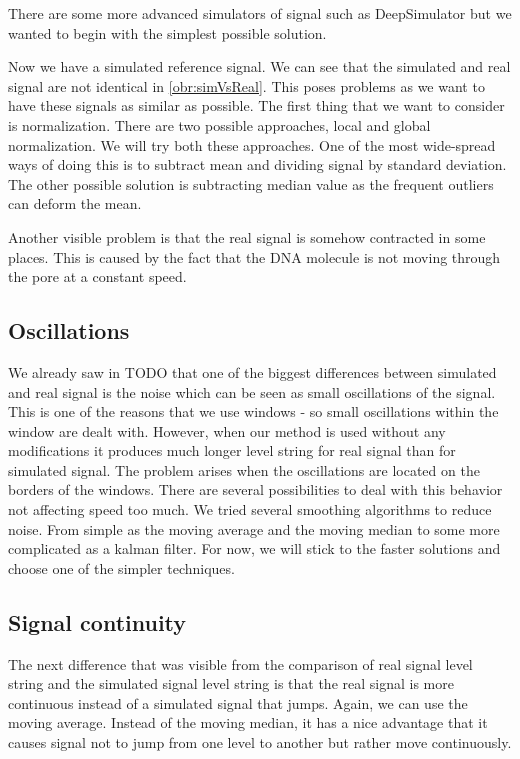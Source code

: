 There are some more advanced simulators of signal such as DeepSimulator but we
wanted to begin with the simplest possible solution.

Now we have a simulated reference signal. We can see that the simulated and real
signal are not identical in \ref{obr:simVsReal}. This poses problems as we want to have these signals as
similar as possible. The first thing that we want to consider is normalization. There
are two possible approaches, local and global normalization. We will try both these
approaches. One of the most wide-spread ways of doing this is to subtract mean and dividing
signal by standard deviation. The other possible solution is subtracting median value
as the frequent outliers can deform the mean. 

Another visible problem is that the real signal is somehow contracted
in some places. This is caused by the fact that the DNA molecule is not moving
through the pore at a constant speed. 

\subsection{Oscillations}

We already saw in TODO that one of the biggest differences between simulated and
real signal is the noise which can be seen as small oscillations of the signal. This is
one of the reasons that we use windows - so small oscillations within the window
are dealt with. However, when our method is used without any modifications it
produces much longer level string for real signal than for simulated signal.
The problem arises when the oscillations are located on the borders of the windows.
There are several possibilities to deal with this behavior not affecting speed too
much. We tried several smoothing algorithms to reduce noise. From simple as the
moving average and the moving median to some more complicated as a kalman filter.
For now, we will stick to the faster solutions and choose one of the simpler techniques.

\subsection{Signal continuity}

The next difference that was visible from the comparison of real signal level string
and the simulated signal level string is that the real signal is more continuous instead
of a simulated signal that jumps. Again, we can use the moving average. Instead of
the moving median, it has a nice advantage that it causes signal not to jump from
one level to another but rather move continuously.


